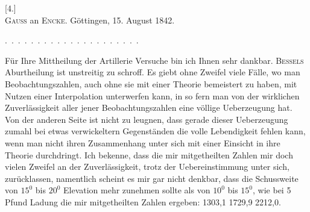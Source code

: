 \clearpage\begingroup{}
\begin{center}
[4.]\\[.7em]
\textsc{Gauss} an \textsc{Encke}. Göttingen, 15. August 1842.
\end{center}
\noindent .\ .\ .\ .\ .\ .\ .\ .\ .\ .\ .\ .\ .\ .\ .\ .\ .\ .\ .\ .\ .
\par\noindent\hspace*{\parindent}Für Ihre Mittheilung der Artillerie Versuche bin ich Ihnen sehr dankbar.
\textsc{Bessels} Aburtheilung ist unstreitig zu schroff. Es giebt ohne Zweifel viele
Fälle, wo man Beobachtungszahlen, auch ohne sie mit einer Theorie bemeistert
zu haben, mit Nutzen einer Interpolation unterwerfen kann, in so fern
man von der wirklichen Zuverlässigkeit aller jener Beobachtungszahlen eine
völlige Ueberzeugung hat. Von der anderen Seite ist nicht zu leugnen, dass
gerade dieser Ueberzeugung zumahl bei etwas verwickeltern Gegenständen
die volle Lebendigkeit fehlen kann, wenn man nicht ihren Zusammenhang unter
sich mit einer Einsicht in ihre Theorie durchdringt. Ich bekenne, dass die
mir mitgetheilten Zahlen mir doch vielen Zweifel an der Zuverlässigkeit, trotz
der Uebereinstimmung unter sich, zurücklassen, namentlich scheint es mir gar
nicht denkbar, dass die Schussweite von \(15^0\) bis \(20^0\) Elevation mehr zunehmen
sollte als von \(10^0\) bis \(15^0\), wie bei 5 Pfund Ladung die mir mitgetheilten
Zahlen ergeben: 1303,1 1729,9 2212,0.

